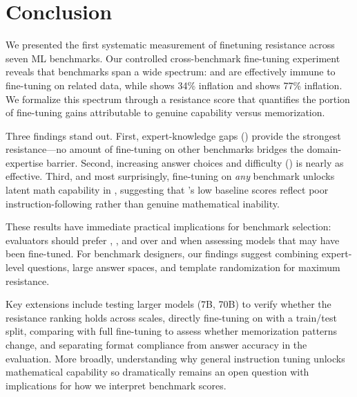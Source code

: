 \section{Conclusion}
\label{sec:conclusion}

We presented the first systematic measurement of finetuning resistance across seven ML benchmarks. Our controlled cross-benchmark fine-tuning experiment reveals that benchmarks span a wide spectrum: \gpqa and \mmlupro are effectively immune to fine-tuning on related data, while \gsmk shows 34\% inflation and \wino shows 77\% inflation. We formalize this spectrum through a resistance score that quantifies the portion of fine-tuning gains attributable to genuine capability versus memorization.

Three findings stand out. First, expert-knowledge gaps (\gpqa) provide the strongest resistance---no amount of fine-tuning on other benchmarks bridges the domain-expertise barrier. Second, increasing answer choices and difficulty (\mmlupro) is nearly as effective. Third, and most surprisingly, fine-tuning on \emph{any} benchmark unlocks latent math capability in \qwen, suggesting that \gsmk's low baseline scores reflect poor instruction-following rather than genuine mathematical inability.

These results have immediate practical implications for benchmark selection: evaluators should prefer \gpqa, \mmlupro, and \arc over \gsmk and \wino when assessing models that may have been fine-tuned. For benchmark designers, our findings suggest combining expert-level questions, large answer spaces, and template randomization for maximum resistance.

 Key extensions include testing larger models (7B, 70B) to verify whether the resistance ranking holds across scales, directly fine-tuning on \gpqa with a train/test split, comparing \lora with full fine-tuning to assess whether memorization patterns change, and separating format compliance from answer accuracy in the \gsmk evaluation. More broadly, understanding why general instruction tuning unlocks mathematical capability so dramatically remains an open question with implications for how we interpret benchmark scores.
